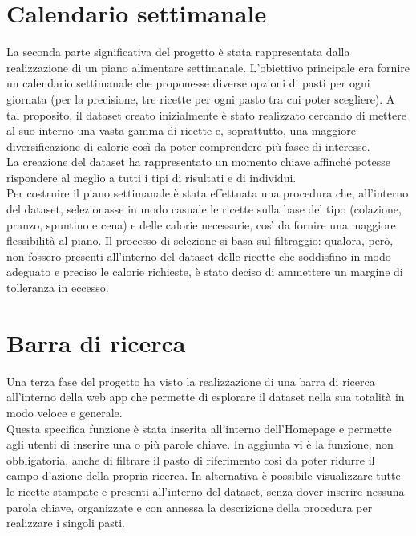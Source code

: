 \documentclass[11pt]{article}
\begin{document}
\section{Calendario settimanale}
La seconda parte significativa del progetto è stata rappresentata dalla realizzazione di un piano alimentare settimanale. L’obiettivo principale era fornire un calendario settimanale che proponesse diverse opzioni di pasti per ogni giornata (per la precisione, tre ricette per ogni pasto tra cui poter scegliere). A tal proposito, il dataset creato inizialmente è stato realizzato cercando di mettere al suo interno una vasta gamma di ricette e, soprattutto, una maggiore diversificazione di calorie così da poter comprendere più fasce di interesse.\\
La creazione del dataset ha rappresentato un momento chiave affinché potesse rispondere al meglio a tutti i tipi di risultati e di individui.\\
Per costruire il piano settimanale è stata effettuata una procedura che, all’interno del dataset,  selezionasse in modo casuale le ricette sulla base del tipo (colazione, pranzo, spuntino e cena) e delle calorie necessarie, così da fornire una maggiore flessibilità al piano. Il processo di selezione si basa sul filtraggio: qualora, però, non fossero presenti all'interno del dataset delle ricette che soddisfino in modo adeguato e preciso le calorie richieste, è stato deciso di ammettere un margine di tolleranza in eccesso. 
\section{Barra di ricerca} Una terza fase del progetto ha visto la realizzazione di una barra di ricerca all'interno della web app che permette di esplorare il dataset nella sua totalità in modo veloce e generale.\\
Questa specifica funzione è stata inserita all’interno dell’Homepage e permette agli utenti di inserire una o più parole chiave. In aggiunta vi è la funzione, non obbligatoria, anche di filtrare il pasto di riferimento così da poter ridurre il campo d'azione della propria ricerca. In alternativa è possibile visualizzare tutte le ricette stampate e presenti all’interno del dataset, senza dover inserire nessuna parola chiave, organizzate e con annessa la descrizione della procedura per realizzare i singoli pasti. 
\end{document}
